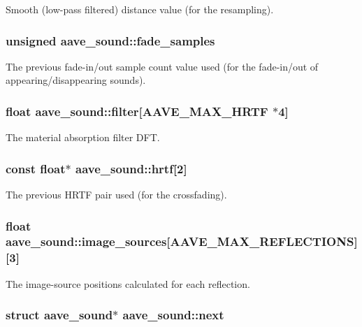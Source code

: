 Smooth (low-\/pass filtered) distance value (for the resampling). \hypertarget{structaave__sound_ad4ce9aa0eca1519c53465d9704fd6efa}{
\subsubsection[{fade\-\_\-samples}]{\setlength{\rightskip}{0pt plus 5cm}unsigned aave\-\_\-sound\-::fade\-\_\-samples}}\label{structaave__sound_ad4ce9aa0eca1519c53465d9704fd6efa}
The previous fade-\/in/out sample count value used (for the fade-\/in/out of appearing/disappearing sounds). \hypertarget{structaave__sound_a6e27d4a259442303d940706031c2ee83}{
\subsubsection[{filter}]{\setlength{\rightskip}{0pt plus 5cm}float aave\-\_\-sound\-::filter\mbox{[}{\bf A\-A\-V\-E\-\_\-\-M\-A\-X\-\_\-\-H\-R\-T\-F} $\ast$4\mbox{]}}}\label{structaave__sound_a6e27d4a259442303d940706031c2ee83}
The material absorption filter D\-F\-T. \hypertarget{structaave__sound_a01efd817868c055126f2aea812a44d1a}{
\subsubsection[{hrtf}]{\setlength{\rightskip}{0pt plus 5cm}const float$\ast$ aave\-\_\-sound\-::hrtf\mbox{[}2\mbox{]}}}\label{structaave__sound_a01efd817868c055126f2aea812a44d1a}
The previous H\-R\-T\-F pair used (for the crossfading). \hypertarget{structaave__sound_a0627e96d3a12a30fec75a65cc6f402a7}{
\subsubsection[{image\-\_\-sources}]{\setlength{\rightskip}{0pt plus 5cm}float aave\-\_\-sound\-::image\-\_\-sources\mbox{[}{\bf A\-A\-V\-E\-\_\-\-M\-A\-X\-\_\-\-R\-E\-F\-L\-E\-C\-T\-I\-O\-N\-S}\mbox{]}\mbox{[}3\mbox{]}}}\label{structaave__sound_a0627e96d3a12a30fec75a65cc6f402a7}
The image-\/source positions calculated for each reflection. \hypertarget{structaave__sound_a3e64f8a8399ae64de4d5ebd266fd7eb3}{
\subsubsection[{next}]{\setlength{\rightskip}{0pt plus 5cm}struct {\bf aave\-\_\-sound}$\ast$ aave\-\_\-sound\-::next}}\label{structaave__sound_a3e64f8a8399ae64de4d5ebd266fd7eb3}
